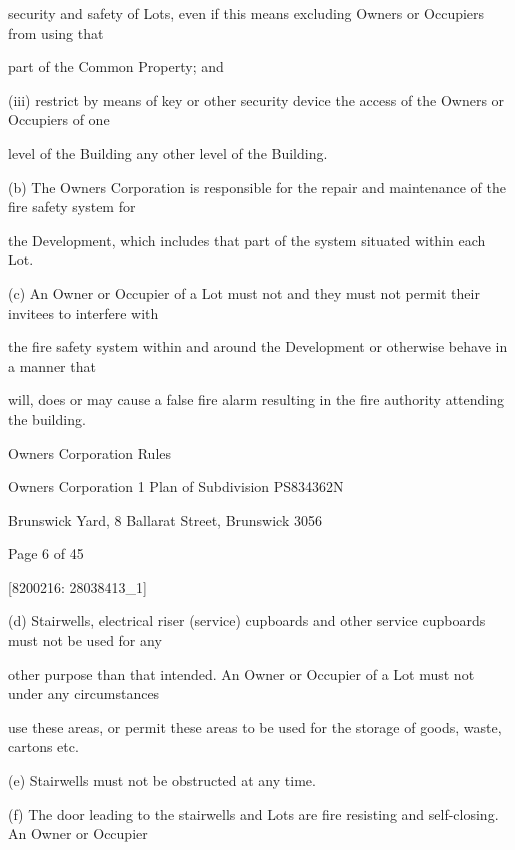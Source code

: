 \documentclass{article}
\begin{document}
{\fontsize{10.02}{1}security and safety of Lots, even if this means excluding Owners or Occupiers from using that }

{\fontsize{10.02}{1}part of the Common Property; and }

{\fontsize{9.962}{1}(iii) restrict by means of key or other security device the access of the Owners or Occupiers of one }

{\fontsize{10.02}{1}level of the Building any other level of the Building. }

{\fontsize{9.962}{1}(b) The Owners Corporation is responsible for the repair and maintenance of the fire safety system for }

{\fontsize{10.02}{1}the Development, which includes that part of the system situated within each Lot. }

{\fontsize{9.962}{1}(c) An Owner or Occupier of a Lot must not and they must not permit their invitees to interfere with }

{\fontsize{10.02}{1}the fire safety system within and around the Development or otherwise behave in a manner that }

{\fontsize{10.02}{1}will, does or may cause a false fire alarm resulting in the fire authority attending the building. }

\newpage





{\fontsize{9}{1}Owners Corporation Rules }

{\fontsize{9}{1}Owners Corporation 1 Plan of Subdivision PS834362N }

{\fontsize{9}{1}Brunswick Yard, 8 Ballarat Street, Brunswick 3056 }


{\fontsize{9}{1}Page 6  of 45 }



{\fontsize{7.02}{1}[8200216: 28038413\_1] }


{\fontsize{9.962}{1}(d) Stairwells, electrical riser (service) cupboards and other service cupboards must not be used for any }

{\fontsize{10.02}{1}other purpose than that intended. An Owner or Occupier of a Lot must not under any circumstances }

{\fontsize{10.02}{1}use these areas, or permit these areas to be used for the storage of goods, waste, cartons etc. }

{\fontsize{9.962}{1}(e) Stairwells must not be obstructed at any time. }

{\fontsize{9.962}{1}(f) The door leading to the stairwells and Lots are fire resisting and self-closing. An Owner or Occupier }
\end{document}

